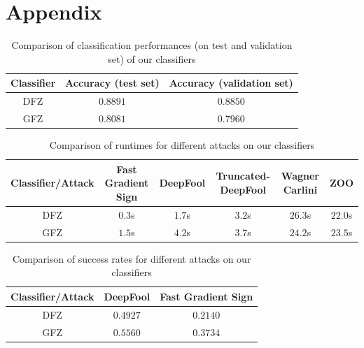 \documentclass[10pt,twocolumn,letterpaper]{article}
\begin{document}
\section{Appendix}
\label{sec:appendix}

\begin{table}[ht]
    \centering
    \begin{tabular}{|c|c|c|}
        \hline
        \textbf{Classifier} & \textbf{Accuracy (test set)} & \textbf{Accuracy (validation set)} \\
        \hline
        DFZ & $0.8891$ & $0.8850$ \\
        \hline
        GFZ & $0.8081$ & $0.7960$ \\
        \hline
    \end{tabular}
    \caption{Comparison of classification performances (on test and validation set) of our classifiers}
    \label{tab:classification_performances}
\end{table}

\begin{table}[ht]
    \centering
    \begin{tabular}{|c|c|c|c|c|c|}
        \hline
        \textbf{Classifier/Attack} & \textbf{Fast Gradient Sign} & \textbf{DeepFool} & \textbf{Truncated-DeepFool} & \textbf{Wagner Carlini} & \textbf{ZOO} \\
        \hline
        DFZ & $0.3$s & $1.7$s & $3.2$s & $26.3$s & $22.0$s \\
        \hline
        GFZ & $1.5$s & $4.2$s & $3.7$s & $24.2$s & $23.5$s \\
        \hline
    \end{tabular}
    \caption{Comparison of runtimes for different attacks on our classifiers}
    \label{tab:runtimes}
\end{table}

\begin{table}[ht]
    \centering
    \begin{tabular}{|c|c|c|}
        \hline
        \textbf{Classifier/Attack} & \textbf{DeepFool} & \textbf{Fast Gradient Sign} \\
        \hline
        DFZ & $0.4927$ & $0.2140$ \\
        \hline
        GFZ & $0.5560$ & $0.3734$ \\
        \hline
    \end{tabular}
    \caption{Comparison of success rates for different attacks on our classifiers}
    \label{tab:success_rates}
\end{table}
\end{document}
